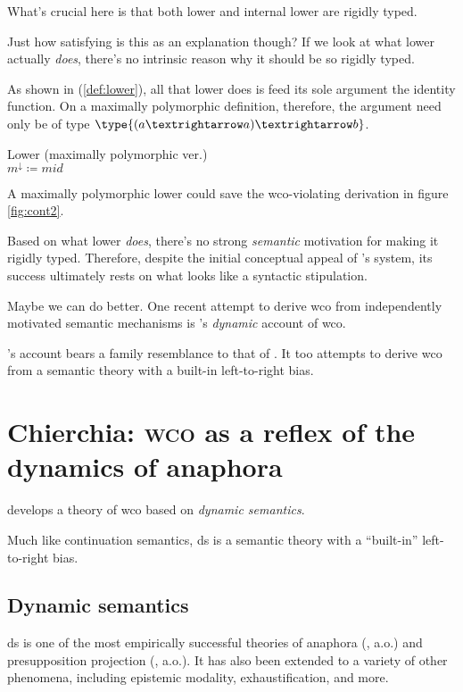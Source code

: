 \documentclass[nols,twoside,nofonts,nobib,nohyper]{tufte-handout}
\begin{document}
What's crucial here is that both lower and internal lower are rigidly typed.

Just how satisfying is this as an explanation though? If we look at what lower
actually \textit{does}, there's no intrinsic reason why it should be so rigidly
typed.

As shown in (\ref{def:lower}), all that lower does is feed its sole argument the
identity function. On a maximally polymorphic definition, therefore, the
argument need only be of type $\type{(a → a) → b}$.


\ex Lower (maximally polymorphic ver.)\\
$m^{↓} ≔ m id$\label{def:lower}
\xe

A maximally polymorphic lower could save the \ac{wco}-violating derivation in
figure \ref{fig:cont2}.

Based on what lower \textit{does}, there's no strong \textit{semantic}
motivation for making it rigidly typed. Therefore, despite the initial
conceptual appeal of \citeauthor{barkerShan2015}'s system, its success
ultimately rests on what looks like a syntactic stipulation.

Maybe we can do better. One recent attempt to derive \ac{wco} from independently
motivated semantic mechanisms is \citeauthor{chierchia2020}'s \textit{dynamic}
account of \ac{wco}.

\citeauthor{chierchia2020}'s account bears a family resemblance to that of
\citeauthor{barkerShan2015}. It too attempts to derive \ac{wco} from a semantic theory
with a built-in left-to-right bias.

\section{Chierchia: \textsc{wco} as a reflex of the dynamics of anaphora}

\citet{chierchia2020} develops a theory of \ac{wco} based on \textit{dynamic
  semantics}.

Much like continuation semantics, \ac{ds} is a semantic theory with a
\enquote{built-in} left-to-right bias.

\subsection{Dynamic semantics}

\ac{ds} is one of the most empirically successful theories of anaphora
(\citealt{heim1982,groenendijk_dynamic_1991,dekker1994}, a.o.) and
presupposition projection (\citealt{heim1983,beaver_presupposition_2001}, a.o.).
It has also been extended to a variety of other phenomena, including epistemic
modality, exhaustification, and more.
\end{document}
